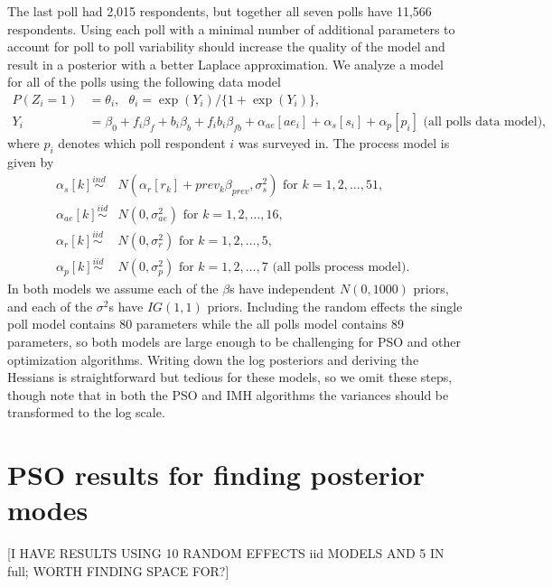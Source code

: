 \documentclass[12pt]{article}
\begin{document}
The last poll had 2,015 respondents, but together all seven polls have 11,566 respondents. Using each poll with a minimal number of additional parameters to account for poll to poll variability should increase the quality of the model and result in a posterior with a better Laplace approximation. We analyze a model for all of the polls using the following data model
\begin{align}
P(Z_i = 1) &= \theta_i,\ \ \   \theta_i = \exp(Y_i)/\{1 + \exp(Y_i)\}, \nonumber\\
Y_i &= \beta_0 + f_i\beta_f + b_i\beta_b + f_ib_i\beta_{fb} + \alpha_{ae}[ae_i] + \alpha_{s}[s_i] + \alpha_p[p_i]\mbox{\ \ \ \ (all polls data model), }
\end{align}
where $p_i$ denotes which poll respondent $i$ was surveyed in. The process model is given by
\begin{align}
\alpha_s[k] \stackrel{ind}{\sim}& N(\alpha_r[r_k] + prev_k\beta_{prev}, \sigma^2_s) \mbox{ for } k=1,2,\dots,51,\nonumber\\
\alpha_{ae}[k] \stackrel{iid}{\sim}& N(0, \sigma^2_{ae}) \mbox{ for } k=1,2,\dots,16,\nonumber\\
\alpha_{r}[k] \stackrel{iid}{\sim}& N(0, \sigma^2_{r}) \mbox{ for } k=1,2,\dots,5,\\ \nonumber
\alpha_{p}[k] \stackrel{iid}{\sim}& N(0, \sigma^2_{p}) \mbox{ for } k=1,2,\dots,7 \mbox{\ \ \ \ (all polls process model). }
\end{align}
In both models we assume each of the $\beta$s have independent $N(0,1000)$ priors, and each of the 
$\sigma^2$s have $IG(1,1)$ priors. Including the random effects the single poll model contains 80 parameters while the all polls model contains 89 parameters, so both models are large enough to be challenging for PSO and other optimization algorithms. Writing down the log posteriors and deriving the Hessians is straightforward but tedious for these models, so we omit these steps, though note that in both the PSO and IMH algorithms the variances should be transformed to the log scale.

\section{PSO results for finding posterior modes}\label{sec:psomode}

[I HAVE RESULTS USING 10 RANDOM EFFECTS iid MODELS AND 5 IN full; WORTH FINDING SPACE FOR?]
\end{document}
